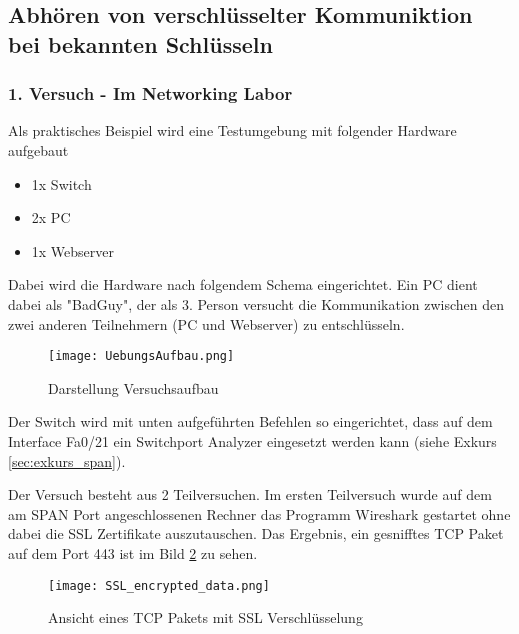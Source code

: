 	\subsection{Abhören von verschlüsselter Kommuniktion bei bekannten Schlüsseln}
	\subsubsection{1. Versuch - Im Networking Labor}
	Als praktisches Beispiel wird eine Testumgebung mit folgender Hardware aufgebaut
	\begin{itemize}
		\item 1x Switch
		\item 2x PC
		\item 1x Webserver
	\end{itemize}
	Dabei wird die Hardware nach folgendem Schema eingerichtet. Ein PC dient dabei als "BadGuy", der als 3. Person versucht
	die Kommunikation zwischen den zwei anderen Teilnehmern (PC und Webserver) zu entschlüsseln.
	\begin{figure}[H]
		\centering
		\texttt{[image: UebungsAufbau.png]}
		\caption{Darstellung Versuchsaufbau}
		\label{fig:versuchsaufbau}
	\end{figure}
	Der Switch wird mit unten aufgeführten Befehlen so eingerichtet, dass auf dem Interface Fa0/21 ein Switchport Analyzer eingesetzt werden kann (siehe Exkurs \ref{sec:exkurs_span}).
	
	Der Versuch besteht aus 2 Teilversuchen. Im ersten Teilversuch wurde auf dem am SPAN Port angeschlossenen Rechner das Programm Wireshark gestartet ohne dabei die SSL Zertifikate auszutauschen. Das Ergebnis, ein gesnifftes TCP Paket auf dem Port 443 ist im Bild \ref{fig:ssl_encrypted_data} zu sehen.
	\begin{figure}[H]
		\centering
		\texttt{[image: SSL\_encrypted\_data.png]}
		\caption{Ansicht eines TCP Pakets mit SSL Verschlüsselung}
		\label{fig:ssl_encrypted_data}
	\end{figure}
	
